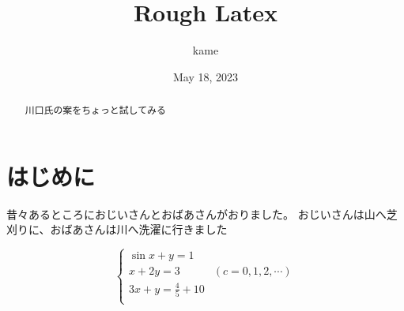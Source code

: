 \documentclass[titlepage]{jsarticle}
\title{Rough Latex}
\author{kame}
\date{May 18, 2023}
\begin{document}
\maketitle

\begin{abstract}川口氏の案をちょっと試してみる\end{abstract}
\section{はじめに}
昔々あるところにおじいさんとおばあさんがおりました。
おじいさんは山へ芝刈りに、おばあさんは川へ洗濯に行きました



\[
\left\{
\begin{array}{}
 \sin x+y=1 \\
x+2y=3 & (c=0,1,2,\cdots)  \\
3x+y=\frac{4}{5}+10 \\
\end{array}
\right.
\]
\end{document}
